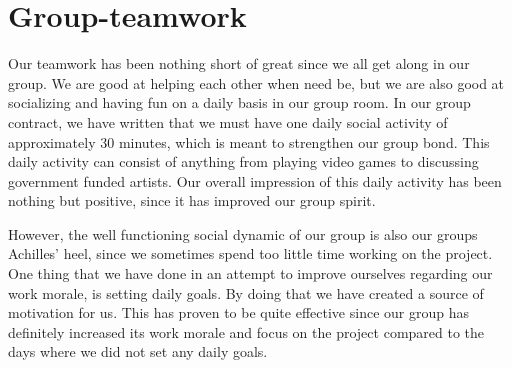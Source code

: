\section{Group-teamwork}
Our teamwork has been nothing short of great since we all get along in our group. We are good at helping each other when need be, but we are also good at socializing and having fun on a daily basis in our group room. In our group contract, we have written that we must have one daily social activity of approximately 30 minutes, which is meant to strengthen our group bond. This daily activity can consist of anything from playing video games to discussing government funded artists. 
Our overall impression of this daily activity has been nothing but positive, since it has improved our group spirit.

However, the well functioning social dynamic of our group is also our groups Achilles' heel, since we sometimes spend too little time working on the project. One thing that we have done in an attempt to improve ourselves regarding our work morale, is setting daily goals. By doing that we have created a source of motivation for us. This has proven to be quite effective since our group has definitely increased its work morale and focus on the project compared to the days where we did not set any daily goals. 